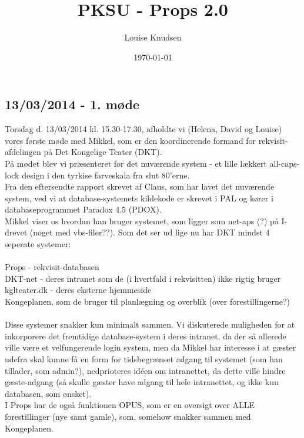 \documentclass[12pt]{article}
\title{PKSU - Props 2.0}
\author{Louise Knudsen}
\date{\today}
\begin{document}
\maketitle
\subsection*{13/03/2014 - 1. møde}
Torsdag d. 13/03/2014 kl. 15.30-17.30, afholdte vi (Helena, David og Louise) vores første møde med Mikkel, som er den koordinerende formand for rekvisit-afdelingen på Det Kongelige Teater (DKT). \\
På mødet blev vi præsenteret for det nuværende system - et lille lækkert all-caps-lock design i den tyrkise farveskala fra slut 80'erne. \\
Fra den eftersendte rapport skrevet af Claus, som har lavet det nuværende system, ved vi at database-systemets kildekode er skrevet i PAL og kører i databaseprogrammet Paradox 4.5 (PDOX). \\
Mikkel viser os hvordan han bruger systemet, som ligger som net-aps (?) på I-drevet (noget med vbs-filer??). Som det ser ud lige nu har DKT mindst 4 seperate systemer: \\\\
Props - rekvisit-databasen \\
DKT-net - deres intranet som de (i hvertfald i rekvisitten) ikke rigtig bruger \\
kglteater.dk - deres eksterne hjemmeside\\
Kongeplanen, som de bruger til planlægning og overblik (over forestillingerne?) \\\\
Disse systemer snakker kun minimalt sammen. Vi diskuterede muligheden for at inkorporere det fremtidige database-system i deres intranet, da der så allerede ville være et velfungerende login system, men da Mikkel har interesse i at gæster udefra skal kunne få en form for tidsbegrænset adgang til systemet (som han tillader, som admin?), nedprioteres idéen om intranettet, da dette ville hindre gæste-adgang (så skulle gæster have adgang til hele intranettet, og ikke kun databasen, som ønsket). \\
I Props har de også funktionen OPUS, som er en oversigt over ALLE forestillinger (nye samt gamle), som, somehow snakker sammen med Kongeplanen.
\end{document}
